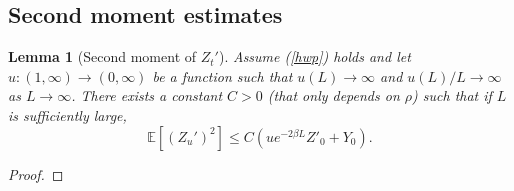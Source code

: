 \documentclass[11pt]{article}
\theoremstyle{plain}
\newtheorem{lemma}{Lemma}[section]
\begin{document}
\subsection{Second moment estimates}\label{sec:sm}
\begin{lemma}[Second moment of $Z_t'$]\label{lem:smZ}
Assume (\ref{hwp}) holds and let $u:(1,\infty)\rightarrow (0,\infty)$ be a function such that $u(L)\rightarrow \infty$  and $u(L)/L\rightarrow \infty$ as $L\rightarrow \infty$. There exists a constant $C>0$ (that only depends on $\rho$) such that if $L$ is sufficiently large,
\begin{equation*}
   \mathbb{E}[(Z_u')^2]\leqslant C\left(ue^{-2\beta L}Z'_0+Y_0\right). 
\end{equation*}
\end{lemma}
\begin{proof}


\end{proof}
\end{document}
